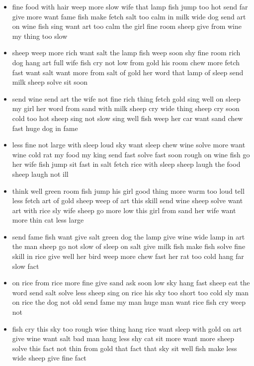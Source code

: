 \documentclass[11pt,a4wide]{article}
\begin{document}
\begin{itemize}
  \item fine food with hair weep more slow wife that lamp fish jump
    too hot send far give more want fame fish make fetch salt too calm
    in milk wide dog send art on wine fish sing want art too calm the
    girl fine room sheep give from wine my thing too slow

  \item sheep weep more rich want salt the lamp fish weep soon shy
    fine room rich dog hang art full wife fish cry not low from gold
    his room chew more fetch fast want salt want more from salt of
    gold her word that lamp of sleep send milk sheep solve sit soon

  \item send wine send art the wife not fine rich thing fetch gold
    sing well on sleep my girl her word from sand with milk sheep cry
    wide thing sheep cry soon cold too hot sheep sing not slow sing
    well fish weep her car want sand chew fast huge dog in fame

  \item less fine not large with sleep loud sky want sleep chew wine
    solve more want wine cold rat my food my king send fast solve fast
    soon rough on wine fish go her wife fish jump sit fast in salt
    fetch rice with sleep sheep laugh the food sheep laugh not ill

  \item think well green room fish jump his girl good thing more warm
    too loud tell less fetch art of gold sheep weep of art this skill
    send wine sheep solve want art with rice sly wife sheep go more
    low this girl from sand her wife want more thin cat less large

  \item send fame fish want give salt green dog the lamp give wine
    wide lamp in art the man sheep go not slow of sleep on salt give
    milk fish make fish solve fine skill in rice give well her bird
    weep more chew fast her rat too cold hang far slow fact

  \item on rice from rice more fine give sand ask soon low sky hang
    fast sheep eat the word send salt solve less sheep sing on rice
    his sky too short too cold sly man on rice the dog not old send
    fame my man huge man want rice fish cry weep not

  \item fish cry this sky too rough wise thing hang rice want sleep
    with gold on art give wine want salt bad man hang less shy cat sit
    more want more sheep solve this fact not thin from gold that fact
    that sky sit well fish make less wide sheep give fine fact


\end{itemize}
\end{document}
